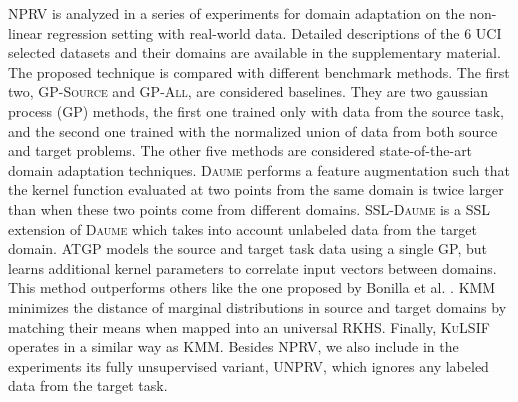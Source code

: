 \documentclass{article}
\begin{document}
\textsc{NPRV} is analyzed in a series of experiments for domain adaptation on
the non-linear regression setting with real-world data.  Detailed descriptions
of the 6 UCI selected datasets and their domains are available in the
supplementary material.  The proposed technique is compared with different
benchmark methods.  The first two, \textsc{GP-Source} and \textsc{GP-All}, are
considered baselines.  They are two gaussian process (GP) methods, the first
one trained only with data from the source task, and the second one trained
with the normalized union of data from both source and target problems.  The
other five methods are considered state-of-the-art domain adaptation
techniques.  \textsc{Daume} \cite{daume} performs a feature augmentation such
that the kernel function evaluated at two points from the same domain is twice
larger than when these two points come from different domains.
\textsc{SSL-Daume}  \cite{ssldaume} is a SSL extension of \textsc{Daume} which
takes into account unlabeled data from the target domain.  \textsc{ATGP}
\cite{bin} models the source and target task data using a single GP, but learns
additional kernel parameters to correlate input vectors between domains. This
method outperforms others like the one proposed by Bonilla et al.
\cite{bonilla}.  \textsc{KMM} \cite{kmm} minimizes the distance of marginal
distributions in source and target domains by matching their means when mapped
into an universal RKHS. Finally, \textsc{KuLSIF} \cite{kulsif} operates in a
similar way as \textsc{KMM}.  Besides \textsc{NPRV}, we also include in the
experiments its fully unsupervised variant, \textsc{UNPRV}, which ignores any
labeled data from the target task.
\end{document}
